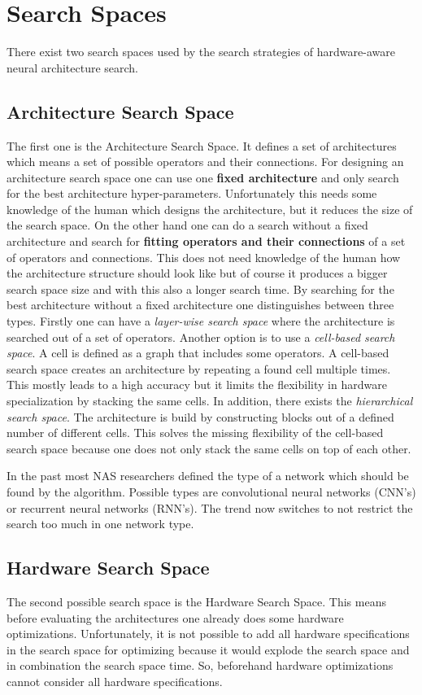 \documentclass[conference]{IEEEtran}
\begin{document}
\section{Search Spaces}
\label{section:SearchSpaces}
There exist two search spaces used by the search strategies of hardware-aware neural architecture search. 

\subsection{Architecture Search Space}
The first one is the Architecture Search Space. It defines a set of architectures which means a set of possible operators and their connections. For designing an architecture search space one can use one \textbf{fixed architecture} and only search for the best architecture hyper-parameters. Unfortunately this needs some knowledge of the human which designs the architecture, but it reduces the size of the search space. On the other hand one can do a search without a fixed architecture and search for \textbf{fitting operators and their connections} of a set of operators and connections. This does not need knowledge of the human how the architecture structure should look like but of course it produces a bigger search space size and with this also a longer search time. By searching for the best architecture without a fixed architecture one distinguishes between three types. Firstly one can have a \textit{layer-wise search space} where the architecture is searched out of a set of operators. Another option is to use a \textit{cell-based search space}. A cell is defined as a graph that includes some operators. A cell-based search space creates an architecture by repeating a found cell multiple times. This mostly leads to a high accuracy but it limits the flexibility in hardware specialization by stacking the same cells. In addition, there exists the \textit{hierarchical search space}. The architecture is build by constructing blocks out of a defined number of different cells. This solves the missing flexibility of the cell-based search space because one does not only stack the same cells on top of each other. 

In the past most NAS researchers defined the type of a network which should be found by the algorithm. Possible types are convolutional neural networks (CNN's) or recurrent neural networks (RNN's). The trend now switches to not restrict the search too much in one network type. 

\subsection{Hardware Search Space}
The second possible search space is the Hardware Search Space. This means before evaluating the architectures one already does some hardware optimizations. Unfortunately, it is not possible to add all hardware specifications in the search space for optimizing because it would explode the search space and in combination the search space time. So, beforehand hardware optimizations cannot consider all hardware specifications.
\end{document}
